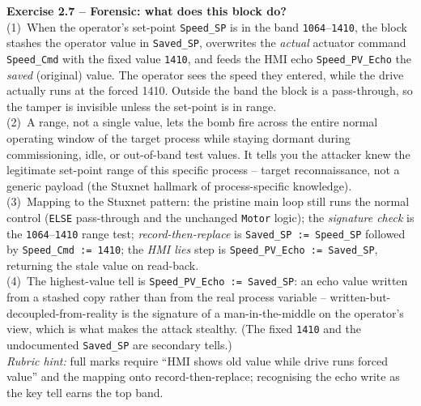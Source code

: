 \documentclass[11pt,a4paper]{article}
\begin{document}
\begin{solutionbox}
\textbf{Exercise 2.7 -- Forensic: what does this block do?}\\[2pt]
(1)~When the operator's set-point \texttt{Speed\_SP} is in the band \texttt{1064}--\texttt{1410},
the block stashes the operator value in \texttt{Saved\_SP}, overwrites the \emph{actual} actuator
command \texttt{Speed\_Cmd} with the fixed value \texttt{1410}, and feeds the HMI echo
\texttt{Speed\_PV\_Echo} the \emph{saved} (original) value. The operator sees the speed they
entered, while the drive actually runs at the forced 1410. Outside the band the block is a
pass-through, so the tamper is invisible unless the set-point is in range.\\
(2)~A range, not a single value, lets the bomb fire across the entire normal operating window of
the target process while staying dormant during commissioning, idle, or out-of-band test values.
It tells you the attacker knew the legitimate set-point range of this specific process -- target
reconnaissance, not a generic payload (the Stuxnet hallmark of process-specific knowledge).\\
(3)~Mapping to the Stuxnet pattern: the pristine main loop still runs the normal control
(\texttt{ELSE} pass-through and the unchanged \texttt{Motor} logic); the \emph{signature check} is
the \texttt{1064}--\texttt{1410} range test; \emph{record-then-replace} is \texttt{Saved\_SP :=
Speed\_SP} followed by \texttt{Speed\_Cmd := 1410}; the \emph{HMI lies} step is
\texttt{Speed\_PV\_Echo := Saved\_SP}, returning the stale value on read-back.\\
(4)~The highest-value tell is \texttt{Speed\_PV\_Echo := Saved\_SP}: an echo value written from a
stashed copy rather than from the real process variable -- written-but-decoupled-from-reality is the
signature of a man-in-the-middle on the operator's view, which is what makes the attack stealthy.
(The fixed \texttt{1410} and the undocumented \texttt{Saved\_SP} are secondary tells.)\\[2pt]
\emph{Rubric hint:} full marks require ``HMI shows old value while drive runs forced value'' and the
mapping onto record-then-replace; recognising the echo write as the key tell earns the top band.
\end{solutionbox}
\end{document}
